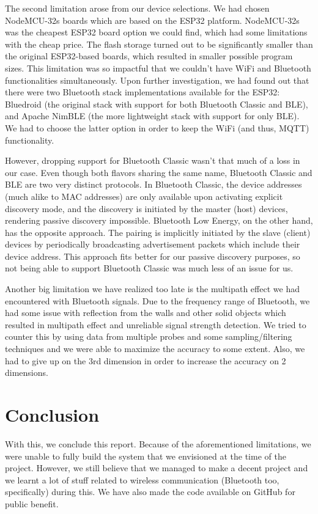 \documentclass[11pt]{article}
\begin{document}
The second limitation arose from our device selections. We had chosen NodeMCU-32s boards which are based on the ESP32 platform. NodeMCU-32s was the cheapest ESP32 board option we could find, which had some limitations with the cheap price. The flash storage turned out to be significantly smaller than the original ESP32-based boards, which resulted in smaller possible program sizes. This limitation was so impactful that we couldn't have WiFi and Bluetooth functionalities simultaneously. Upon further investigation, we had found out that there were two Bluetooth stack implementations available for the ESP32\cite{esp32-bt-api}: Bluedroid (the original stack with support for both Bluetooth Classic and BLE), and Apache NimBLE\cite{esp32-nimble} (the more lightweight stack with support for only BLE). We had to choose the latter option in order to keep the WiFi (and thus, MQTT) functionality. 

However, dropping support for Bluetooth Classic wasn't that much of a loss in our case. Even though both flavors sharing the same name, Bluetooth Classic and BLE are two very distinct protocols. In Bluetooth Classic, the device addresses (much alike to MAC addresses) are only available upon activating explicit discovery mode, and the discovery is initiated by the master (host) devices, rendering passive discovery impossible. Bluetooth Low Energy, on the other hand, has the opposite approach. The pairing is implicitly initiated by the slave (client) devices by periodically broadcasting advertisement packets which include their device address. This approach fits better for our passive discovery purposes, so not being able to support Bluetooth Classic was much less of an issue for us.

Another big limitation we have realized too late is the multipath effect we had encountered with Bluetooth signals. Due to the frequency range of Bluetooth, we had some issue with reflection from the walls and other solid objects which resulted in multipath effect and unreliable signal strength detection. We tried to counter this by using data from multiple probes and some sampling/filtering techniques and we were able to maximize the accuracy to some extent. Also, we had to give up on the 3rd dimension in order to increase the accuracy on 2 dimensions.

\section{Conclusion}

With this, we conclude this report. Because of the aforementioned limitations, we were unable to fully build the system that we envisioned at the time of the project. However, we still believe that we managed to make a decent project and we learnt a lot of stuff related to wireless communication (Bluetooth too, specifically) during this. We have also made the code available on GitHub for public benefit\cite{github}.
\end{document}
